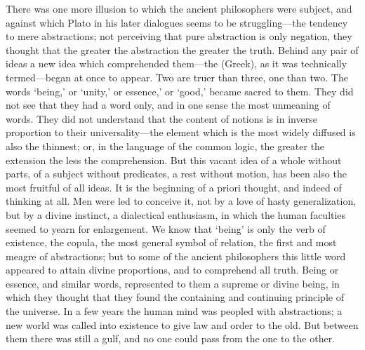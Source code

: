 There was one more illusion to which the ancient philosophers were
subject, and against which Plato in his later dialogues seems to be
struggling—the tendency to mere abstractions; not perceiving that
pure abstraction is only negation, they thought that the greater the
abstraction the greater the truth. Behind any pair of ideas a new idea
which comprehended them—the (Greek), as it was technically termed—began
at once to appear. Two are truer than three, one than two. The words
‘being,’ or ‘unity,’ or essence,’ or ‘good,’ became sacred to them. They
did not see that they had a word only, and in one sense the most unmeaning
of words. They did not understand that the content of notions is in
inverse proportion to their universality—the element which is the
most widely diffused is also the thinnest; or, in the language of the
common logic, the greater the extension the less the comprehension. But
this vacant idea of a whole without parts, of a subject without
predicates, a rest without motion, has been also the most fruitful of all
ideas. It is the beginning of a priori thought, and indeed of thinking at
all. Men were led to conceive it, not by a love of hasty generalization,
but by a divine instinct, a dialectical enthusiasm, in which the human
faculties seemed to yearn for enlargement. We know that ‘being’ is only
the verb of existence, the copula, the most general symbol of relation,
the first and most meagre of abstractions; but to some of the ancient
philosophers this little word appeared to attain divine proportions, and
to comprehend all truth. Being or essence, and similar words, represented
to them a supreme or divine being, in which they thought that they found
the containing and continuing principle of the universe. In a few years
the human mind was peopled with abstractions; a new world was called into
existence to give law and order to the old. But between them there was
still a gulf, and no one could pass from the one to the other.

